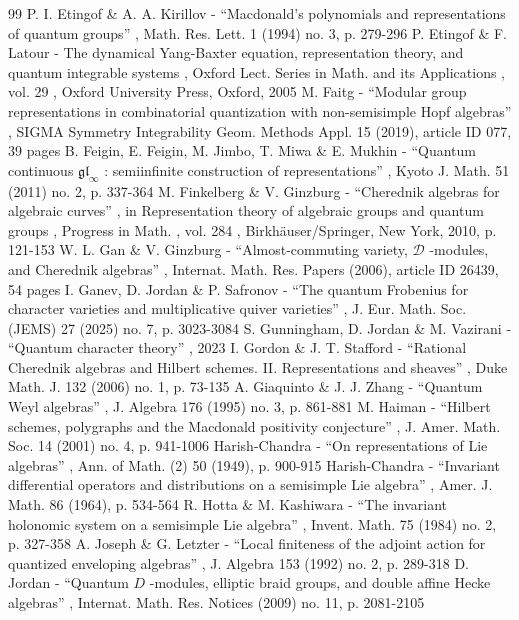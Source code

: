 \documentclass[11pt]{article}
\theoremstyle{definition}
\begin{document}
\begin{thebibliography}{99}
 P. I. Etingof \& A. A. Kirillov - “Macdonald’s polynomials and representations of quantum groups” , Math. Res. Lett. 1 (1994) no. 3, p. 279-296
 P. Etingof \& F. Latour - The dynamical Yang-Baxter equation, representation theory, and quantum integrable systems , Oxford Lect. Series in Math. and its Applications , vol. 29 , Oxford University Press, Oxford, 2005
 M. Faitg - “Modular group representations in combinatorial quantization with non-semisimple Hopf algebras” , SIGMA Symmetry Integrability Geom. Methods Appl. 15 (2019), article ID 077, 39 pages
 B. Feigin, E. Feigin, M. Jimbo, T. Miwa \& E. Mukhin - “Quantum continuous $\mathfrak{gl}_\infty $ : semiinfinite construction of representations” , Kyoto J. Math. 51 (2011) no. 2, p. 337-364
 M. Finkelberg \& V. Ginzburg - “Cherednik algebras for algebraic curves” , in Representation theory of algebraic groups and quantum groups , Progress in Math. , vol. 284 , Birkhäuser/Springer, New York, 2010, p. 121-153
 W. L. Gan \& V. Ginzburg - “Almost-commuting variety, $\mathcal{D}$ -modules, and Cherednik algebras” , Internat. Math. Res. Papers (2006), article ID 26439, 54 pages
 I. Ganev, D. Jordan \& P. Safronov - “The quantum Frobenius for character varieties and multiplicative quiver varieties” , J. Eur. Math. Soc. (JEMS) 27 (2025) no. 7, p. 3023-3084
 S. Gunningham, D. Jordan \& M. Vazirani - “Quantum character theory” , 2023
 I. Gordon \& J. T. Stafford - “Rational Cherednik algebras and Hilbert schemes. II. Representations and sheaves” , Duke Math. J. 132 (2006) no. 1, p. 73-135
 A. Giaquinto \& J. J. Zhang - “Quantum Weyl algebras” , J. Algebra 176 (1995) no. 3, p. 861-881
 M. Haiman - “Hilbert schemes, polygraphs and the Macdonald positivity conjecture” , J. Amer. Math. Soc. 14 (2001) no. 4, p. 941-1006
 Harish-Chandra - “On representations of Lie algebras” , Ann. of Math. (2) 50 (1949), p. 900-915
 Harish-Chandra - “Invariant differential operators and distributions on a semisimple Lie algebra” , Amer. J. Math. 86 (1964), p. 534-564
 R. Hotta \& M. Kashiwara - “The invariant holonomic system on a semisimple Lie algebra” , Invent. Math. 75 (1984) no. 2, p. 327-358
 A. Joseph \& G. Letzter - “Local finiteness of the adjoint action for quantized enveloping algebras” , J. Algebra 153 (1992) no. 2, p. 289-318
 D. Jordan - “Quantum $D$ -modules, elliptic braid groups, and double affine Hecke algebras” , Internat. Math. Res. Notices (2009) no. 11, p. 2081-2105

\end{thebibliography}
\end{document}

